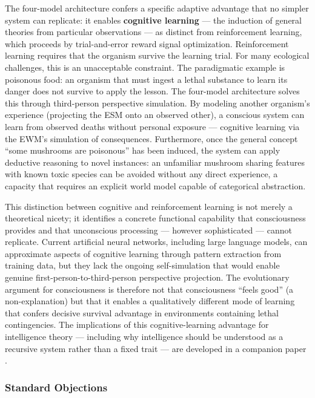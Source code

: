 \documentclass[12pt]{article}
\begin{document}
The four-model architecture confers a specific adaptive advantage that no simpler system can replicate: it enables \textbf{cognitive learning} --- the induction of general theories from particular observations --- as distinct from reinforcement learning, which proceeds by trial-and-error reward signal optimization. Reinforcement learning requires that the organism survive the learning trial. For many ecological challenges, this is an unacceptable constraint. The paradigmatic example is poisonous food: an organism that must ingest a lethal substance to learn its danger does not survive to apply the lesson. The four-model architecture solves this through third-person perspective simulation. By modeling another organism's experience (projecting the ESM onto an observed other), a conscious system can learn from observed deaths without personal exposure --- cognitive learning via the EWM's simulation of consequences. Furthermore, once the general concept ``some mushrooms are poisonous'' has been induced, the system can apply deductive reasoning to novel instances: an unfamiliar mushroom sharing features with known toxic species can be avoided without any direct experience, a capacity that requires an explicit world model capable of categorical abstraction.

This distinction between cognitive and reinforcement learning is not merely a theoretical nicety; it identifies a concrete functional capability that consciousness provides and that unconscious processing --- however sophisticated --- cannot replicate. Current artificial neural networks, including large language models, can approximate aspects of cognitive learning through pattern extraction from training data, but they lack the ongoing self-simulation that would enable genuine first-person-to-third-person perspective projection. The evolutionary argument for consciousness is therefore not that consciousness ``feels good'' (a non-explanation) but that it enables a qualitatively different mode of learning that confers decisive survival advantage in environments containing lethal contingencies. The implications of this cognitive-learning advantage for intelligence theory --- including why intelligence should be understood as a recursive system rather than a fixed trait --- are developed in a companion paper \citep{Gruber2026a}.


\subsubsection{Standard Objections}
\end{document}
